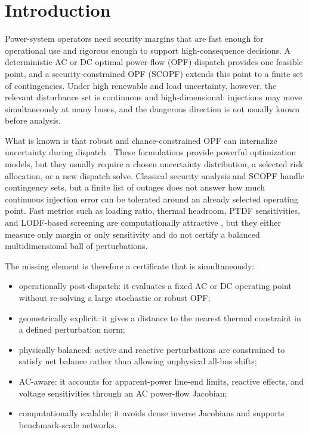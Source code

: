 \documentclass[energies,article,submit,pdftex,moreauthors]{Definitions/mdpi}
\begin{document}
\section{Introduction}

Power-system operators need security margins that are fast enough for operational use and rigorous enough to support high-consequence decisions. A deterministic AC or DC optimal power-flow (OPF) dispatch provides one feasible point, and a security-constrained OPF (SCOPF) extends this point to a finite set of contingencies. Under high renewable and load uncertainty, however, the relevant disturbance set is continuous and high-dimensional: injections may move simultaneously at many buses, and the dangerous direction is not usually known before analysis.

What is known is that robust and chance-constrained OPF can internalize uncertainty during dispatch \citep{BertsimasSim2004,BenTalNemirovski1998,BienstockChertkovHarnett2014,RoaldEtAl2016,LubinBackhausDvorkin2016}. These formulations provide powerful optimization models, but they usually require a chosen uncertainty distribution, a selected risk allocation, or a new dispatch solve. Classical security analysis and SCOPF handle contingency sets, but a finite list of outages does not answer how much continuous injection error can be tolerated around an already selected operating point. Fast metrics such as loading ratio, thermal headroom, PTDF sensitivities, and LODF-based screening are computationally attractive \citep{WoodWollenbergSheble2013}, but they either measure only margin or only sensitivity and do not certify a balanced multidimensional ball of perturbations.

The missing element is therefore a certificate that is simultaneously:
\begin{itemize}
  \item operationally post-dispatch: it evaluates a fixed AC or DC operating point without re-solving a large stochastic or robust OPF;
  \item geometrically explicit: it gives a distance to the nearest thermal constraint in a defined perturbation norm;
  \item physically balanced: active and reactive perturbations are constrained to satisfy net balance rather than allowing unphysical all-bus shifts;
  \item AC-aware: it accounts for apparent-power line-end limits, reactive effects, and voltage sensitivities through an AC power-flow Jacobian;
  \item computationally scalable: it avoids dense inverse Jacobians and supports benchmark-scale networks.
\end{itemize}
\end{document}

